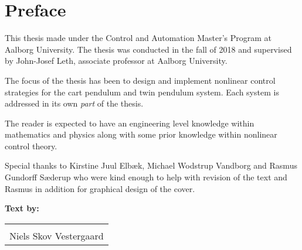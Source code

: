 %
\chapter*{Preface}
\vspace{-12 pt}
This thesis made under the Control and Automation Master's Program at Aalborg University. The thesis was conducted in the fall of 2018 and supervised by John-Josef Leth, associate professor at Aalborg University.

The focus of the thesis has been to design and implement nonlinear control strategies for the cart pendulum and twin pendulum system. Each system is addressed in its own \textit{part} of the thesis.

The reader is expected to have an engineering level knowledge within mathematics and physics along with some prior knowledge within nonlinear control theory.

Special thanks to Kirstine Juul Elbæk, Michael Wodstrup Vandborg and Rasmus Gundorff Sæderup who were kind enough to help with revision of the text and Rasmus in addition for graphical design of the cover.

\vspace{24pt}
%
\textbf{Text by:}\\
\begin{table}[H]
	\centering
		\begin{tabular}{c c c}
	    \multicolumn{3}{c}{\underline{\phantom{- Niels Skov Vestergaard -}}}\\
	    \multicolumn{3}{c}{Niels Skov Vestergaard}\\				
		\end{tabular}
\end{table}
\pagebreak